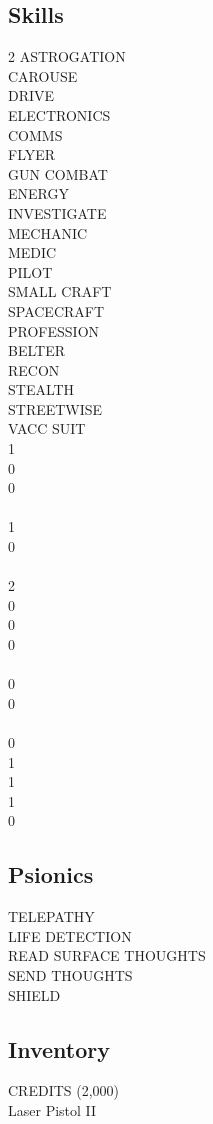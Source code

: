 \documentclass[12pt,a4paper,twocolumn]{article}
\begin{document}
	
	\subsection{Skills}
	\begin{multicols}{2}
		\noindent ASTROGATION\\
		CAROUSE\\
		DRIVE\\
		ELECTRONICS\\
		\indent COMMS\\
		FLYER\\
		GUN COMBAT\\
		\indent ENERGY\\
		INVESTIGATE\\
		MECHANIC\\
		MEDIC\\
		PILOT\\
		\indent SMALL CRAFT\\
		\indent SPACECRAFT\\
		PROFESSION\\
		\indent BELTER\\
		RECON\\
		STEALTH\\
		STREETWISE\\
		VACC SUIT\\
		1\\
		0\\
		0\\
		\\
		1\\
		0\\
		\\
		2\\
		0\\
		0\\
		0\\
		\\
		0\\
		0\\
		\\
		0\\
		1\\
		1\\
		1\\
		0
		
		
	\end{multicols}
	
	
	\subsection{Psionics}
	TELEPATHY\\
	\indent LIFE DETECTION\\
	\indent READ SURFACE THOUGHTS\\
	\indent SEND THOUGHTS\\
	\indent SHIELD
	
	
	
	
	\subsection{Inventory}
	CREDITS (2,000)\\
	Laser Pistol II
	
	
\end{document}
